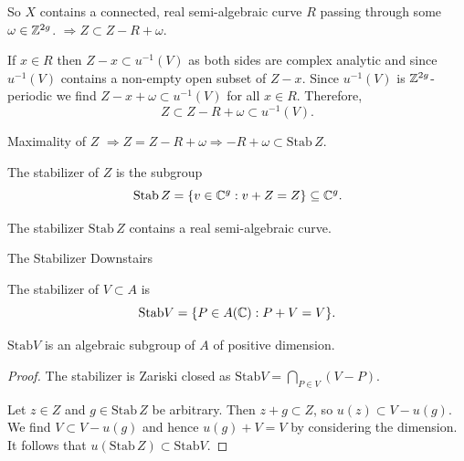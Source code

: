 \documentclass{beamer}
\begin{document}
\begin{frame}
  So $X$ contains a connected, real semi-algebraic curve $R$ passing
  through some $\omega\in{\mathbb{Z}}^{2g}$.  $\Rightarrow Z\subset Z-R+\omega$.

  If $x\in R$ then $Z-x\subset u^{-1}(V)$ as
  both sides are complex analytic and since $u^{-1}(V)$ contains a
  non-empty open subset of $Z-x$. Since $u^{-1}(V)$ is
  ${\mathbb{Z}}^{2g}$-periodic
  we find $Z-x+\omega\subset u^{-1}(V)$ for all $x\in
  R$. Therefore,
  \begin{equation*}
    Z\subset Z-R+\omega \subset u^{-1}(V).
  \end{equation*}

  Maximality of $Z$ $\Rightarrow Z = Z-R+\omega \Rightarrow
  -R+\omega \subset \mathrm{Stab}\, Z$.

  \begin{definition}
    The \alert{stabilizer}
       of $Z$ is the subgroup
    \begin{equation*}
      \mathrm{Stab}\, Z = \{v\in {\mathbb{C}}^g : v+Z=Z\} \subseteq{\mathbb{C}}^g.
    \end{equation*}
  \end{definition}

  \begin{lemma}
    The stabilizer $\mathrm{Stab}\, Z$ contains a real semi-algebraic curve. 
  \end{lemma}
\end{frame}

\begin{frame}{The Stabilizer Downstairs}
  \begin{definition}
    The \alert{stabilizer} of $V\subset A$ is
    \begin{equation*}
      \mathrm{Stab} V = \{P\in A({\mathbb{C}}) : P+V=V\}. 
    \end{equation*}
  \end{definition}


  \begin{lemma}
     $\mathrm{Stab} V$ is an algebraic subgroup of $A$ of
    positive dimension.
  \end{lemma}
  \begin{proof}
    The stabilizer is Zariski closed as
      $\mathrm{Stab} V = \bigcap_{P \in V} (V-P)$.
    
    Let $z\in Z$ and $g\in \mathrm{Stab}\,Z$ be arbitrary. Then $z+g\subset Z$,
    so $u(z) \subset V-u(g)$. We find $V\subset V-u(g)$ and hence
    $u(g)+V=V$ by considering the dimension.
    It follows that 
    $u(\mathrm{Stab}\,Z) \subset\mathrm{Stab} V$.  
  \end{proof}  
\end{frame}
\end{document}
